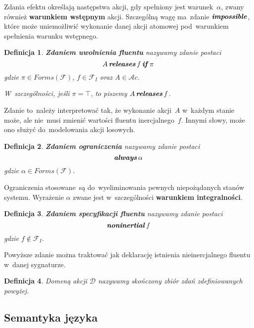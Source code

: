 \documentclass[11pt,a4paper]{article}
\newtheorem{defn}{Definicja}
\DeclareMathOperator{\If}{\textbf{\textit{if}}}
\DeclareMathOperator{\Impossible}{\textbf{\textit{impossible}}}
\DeclareMathOperator{\Releases}{\textbf{\textit{releases}}}
\DeclareMathOperator{\Always}{\textbf{\textit{always}}}
\DeclareMathOperator{\Noninertial}{\textbf{\textit{noninertial}}}
\begin{document}
Zdania efektu określają następstwa akcji, gdy spełniony jest warunek~$\alpha$, zwany również \textbf{warunkiem wstępnym} akcji.
Szczególną wagę ma~zdanie $\Impossible$, które może uniemożliwić wykonanie danej akcji atomowej pod~warunkiem spełnienia warunku wstępnego.

\begin{defn}
    \textbf{Zdaniem uwolnienia fluentu} nazywamy zdanie postaci
    $$ A \Releases f \If \pi $$
    gdzie $\pi \in Forms(\mathcal{F})$, $f \in \mathcal{F}_I$ oraz $A \in \mathcal{A}c$.

    W~szczególności, jeśli $\pi = \top$, to piszemy $A \Releases f$.
\end{defn}

Zdanie to~należy interpretować tak, że wykonanie akcji~$A$ w~każdym stanie może, ale nie~musi zmienić wartości fluentu inercjalnego~$f$.
Innymi słowy, może ono służyć do~modelowania akcji losowych.

\begin{defn}
    \textbf{Zdaniem ograniczenia} nazywamy zdanie postaci
    $$ \Always \alpha $$
    gdzie $\alpha \in Forms(\mathcal{F})$.
\end{defn}

Ograniczenia stosowane~są do~wyeliminowania pewnych niepożądanych stanów systemu.
Wyrażenie $\alpha$ zwane jest w~szczególności \textbf{warunkiem integralności}.

\begin{defn}
    \textbf{Zdaniem specyfikacji fluentu} nazywamy zdanie postaci
    $$ \Noninertial f $$
    gdzie $f \notin \mathcal{F}_I$. 
\end{defn}

Powyższe zdanie można traktować jak deklarację istnienia nieinercjalnego fluentu w~danej sygnaturze.

\begin{defn}
    Domeną akcji $\mathcal{D}$ nazywamy skończony zbiór zdań zdefiniowanych powyżej.
\end{defn}

\subsection{Semantyka języka}
\end{document}
